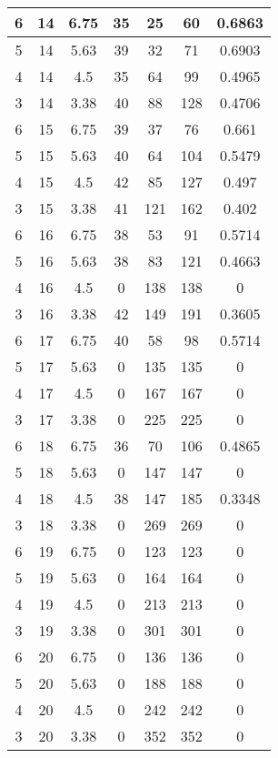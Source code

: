 \documentclass[letterpaper, 12pt]{article}
\begin{document}
\begin{longtable}{|c|c|c|c|c|c|c|}
6 & 14 & 6.75 & 35 & 25 & 60 & 0.6863 \\
\hline
5 & 14 & 5.63 & 39 & 32 & 71 & 0.6903 \\
\hline
4 & 14 & 4.5 & 35 & 64 & 99 & 0.4965 \\
\hline
3 & 14 & 3.38 & 40 & 88 & 128 & 0.4706 \\
\hline
6 & 15 & 6.75 & 39 & 37 & 76 & 0.661 \\
\hline
5 & 15 & 5.63 & 40 & 64 & 104 & 0.5479 \\
\hline
4 & 15 & 4.5 & 42 & 85 & 127 & 0.497 \\
\hline
3 & 15 & 3.38 & 41 & 121 & 162 & 0.402 \\
\hline
6 & 16 & 6.75 & 38 & 53 & 91 & 0.5714 \\
\hline
5 & 16 & 5.63 & 38 & 83 & 121 & 0.4663 \\
\hline
4 & 16 & 4.5 & 0 & 138 & 138 & 0 \\
\hline
3 & 16 & 3.38 & 42 & 149 & 191 & 0.3605 \\
\hline
6 & 17 & 6.75 & 40 & 58 & 98 & 0.5714 \\
\hline
5 & 17 & 5.63 & 0 & 135 & 135 & 0 \\
\hline
4 & 17 & 4.5 & 0 & 167 & 167 & 0 \\
\hline
3 & 17 & 3.38 & 0 & 225 & 225 & 0 \\
\hline
6 & 18 & 6.75 & 36 & 70 & 106 & 0.4865 \\
\hline
5 & 18 & 5.63 & 0 & 147 & 147 & 0 \\
\hline
4 & 18 & 4.5 & 38 & 147 & 185 & 0.3348 \\
\hline
3 & 18 & 3.38 & 0 & 269 & 269 & 0 \\
\hline
6 & 19 & 6.75 & 0 & 123 & 123 & 0 \\
\hline
5 & 19 & 5.63 & 0 & 164 & 164 & 0 \\
\hline
4 & 19 & 4.5 & 0 & 213 & 213 & 0 \\
\hline
3 & 19 & 3.38 & 0 & 301 & 301 & 0 \\
\hline
6 & 20 & 6.75 & 0 & 136 & 136 & 0 \\
\hline
5 & 20 & 5.63 & 0 & 188 & 188 & 0 \\
\hline
4 & 20 & 4.5 & 0 & 242 & 242 & 0 \\
\hline
3 & 20 & 3.38 & 0 & 352 & 352 & 0 \\
\hline
\end{longtable}
\end{document}
